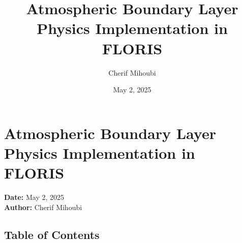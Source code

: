 \documentclass{article}
\title{Atmospheric Boundary Layer Physics Implementation in FLORIS}
\author{Cherif Mihoubi}
\date{May 2, 2025}
\begin{document}
\maketitle

\hypertarget{atmospheric-boundary-layer-physics-implementation-in-floris}{%
\section{Atmospheric Boundary Layer Physics Implementation in
FLORIS}\label{atmospheric-boundary-layer-physics-implementation-in-floris}}

\textbf{Date:} May 2, 2025\\
\textbf{Author:} Cherif Mihoubi

\hypertarget{table-of-contents}{%
\subsection{Table of Contents}\label{table-of-contents}}
\end{document}
